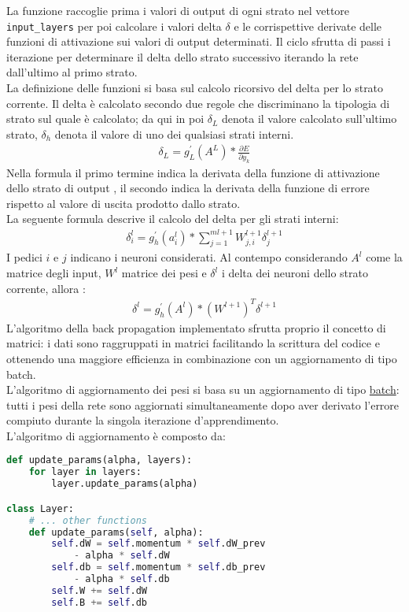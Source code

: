 La funzione raccoglie prima i valori di output di ogni strato nel vettore \texttt{input\_layers} per poi calcolare i valori delta $\delta$ e le corrispettive derivate delle funzioni di attivazione sui valori di output determinati. Il ciclo sfrutta di passi i iterazione per determinare il delta dello strato successivo iterando la rete dall'ultimo al primo strato. \\
La definizione delle funzioni si basa sul calcolo ricorsivo del delta per lo strato corrente.
Il delta è calcolato secondo due regole che discriminano la tipologia di strato sul quale è calcolato; da qui in poi $\delta_L$ denota il valore calcolato sull'ultimo strato, $\delta_h$ denota il valore di uno dei qualsiasi strati interni.
\begin{align*}
\delta_L = g^{\prime}_L(A^L) * \frac{\partial E}{\partial y_k}
\end{align*}
Nella formula il primo termine indica la derivata della funzione di attivazione dello strato di output , il secondo indica la derivata della funzione di errore rispetto al valore di uscita prodotto dallo strato. \\
La seguente formula descrive il calcolo del delta per gli strati interni:
\begin{align*}
\delta_i^l = g^{\prime}_h(a^l_i) * \sum^{ml+1}_{j=1}{W_{j,i}^{l+1} \delta_j^{l+1}}
\end{align*}
I pedici $i$ e $j$ indicano i neuroni considerati. Al contempo considerando $A^l$ come la matrice degli input, $W^l$ matrice dei pesi e $\delta^l$ i delta dei neuroni dello strato corrente, allora :
\begin{align*}
\delta^l = g^{\prime}_h(A^l) * (W^{l+1})^T \delta^{l+1}
\end{align*}
L'algoritmo della back propagation implementato sfrutta proprio il concetto di matrici: i dati sono raggruppati in matrici facilitando la scrittura del codice e ottenendo una maggiore efficienza in combinazione con un aggiornamento di tipo batch.\\
L'algoritmo di aggiornamento dei pesi si basa su un aggiornamento di tipo \underline{batch}: tutti i pesi della rete sono aggiornati simultaneamente dopo aver derivato l'errore compiuto durante la singola iterazione d'apprendimento.\\
L'algoritmo di aggiornamento è composto da:
\begin{lstlisting}[language=Python]
def update_params(alpha, layers):
    for layer in layers:
        layer.update_params(alpha)

class Layer:
    # ... other functions
    def update_params(self, alpha):
        self.dW = self.momentum * self.dW_prev
            - alpha * self.dW
        self.db = self.momentum * self.db_prev 
            - alpha * self.db
        self.W += self.dW
        self.B += self.db
\end{lstlisting}
